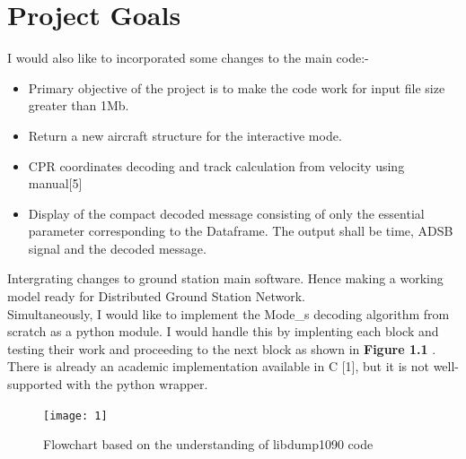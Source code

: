 \documentclass[11pt,a4paper]{report}
\begin{document}
\section{Project Goals}
 
I would also like to incorporated some changes to the main code:-
\begin{itemize}
\item Primary objective of the project is to make the code work for input file size greater than 1Mb.
  \item Return a new aircraft structure for the interactive mode.
  \item CPR coordinates decoding and track calculation from velocity using manual[5]
  \item Display of the compact decoded message consisting of only the essential parameter corresponding to the Dataframe. The output shall be time, ADSB signal and the decoded message.    
\end{itemize}
Intergrating changes to ground station main software. Hence making a working model ready for Distributed Ground Station Network.\\

Simultaneously, I would like to implement the Mode\_s decoding algorithm from scratch as a python module. I would handle this by implenting each block and testing their work and proceeding to the next block as shown in \textbf{Figure 1.1} . There is already an academic implementation available in C [1], but it is not well-supported with the python wrapper.      
\begin{figure}[h]
\centering
\texttt{[image: 1]}
\caption{Flowchart based on the understanding of libdump1090 code  }
\end{figure}
\end{document}
